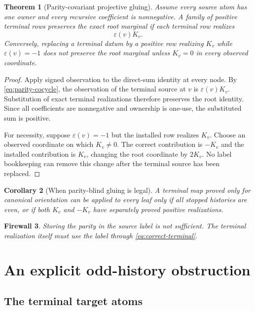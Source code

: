 \documentclass[11pt]{article}
\newtheorem{theorem}{Theorem}[section]
\newtheorem{corollary}[theorem]{Corollary}
\newtheorem{firewall}[theorem]{Firewall}
\newcommand{\1}{\mathbf 1}
\newcommand{\eps}{\varepsilon}
\begin{document}
\begin{theorem}[Parity-covariant projective gluing]
\label{thm:parity-gluing}
Assume every source atom has one owner and every recursive coefficient is
nonnegative.  A family of positive terminal rows preserves the exact root
marginal if each terminal row realizes
\begin{equation}
 \eps(v)K_v.
 \label{eq:correct-terminal}
\end{equation}
Conversely, replacing a terminal datum by a positive row realizing $K_v$ while
$\eps(v)=-1$ does not preserve the root marginal unless $K_v=0$ in every
observed coordinate.
\end{theorem}

\begin{proof}
Apply signed observation to the direct-sum identity at every node.  By
\eqref{eq:parity-cocycle}, the observation of the terminal source at $v$ is
$\eps(v)K_v$.  Substitution of exact terminal realizations therefore preserves
the root identity.  Since all coefficients are nonnegative and ownership is
one-use, the substituted sum is positive.

For necessity, suppose $\eps(v)=-1$ but the installed row realizes $K_v$.
Choose an observed coordinate on which $K_v\ne0$.  The correct contribution is
$-K_v$ and the installed contribution is $K_v$, changing the root coordinate
by $2K_v$.  No label bookkeeping can remove this change after the terminal
source has been replaced.
\end{proof}

\begin{corollary}[When parity-blind gluing is legal]
A terminal map proved only for canonical orientation can be applied to every
leaf only if all stopped histories are even, or if both $K_v$ and $-K_v$ have
separately proved positive realizations.
\end{corollary}

\begin{firewall}
Storing the parity in the source label is not sufficient.  The terminal
realization itself must use the label through \eqref{eq:correct-terminal}.
\end{firewall}

\section{An explicit odd-history obstruction}

\subsection{The terminal target atoms}
\end{document}
